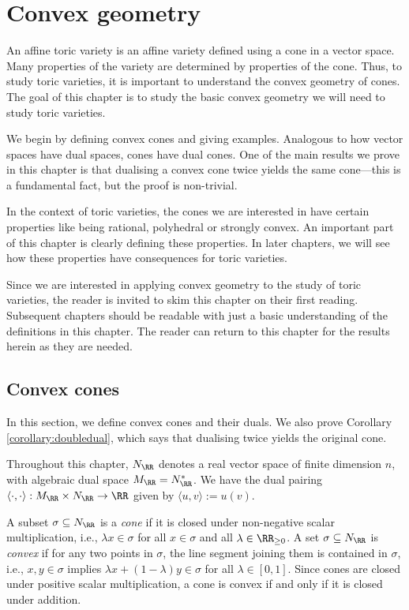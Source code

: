 \documentclass[12pt]{amsart}
\theoremstyle{plain}
\begin{document}
\newpage
{}
\section{Convex geometry}\label{sectionconvexgeometry}
An affine toric variety is an affine variety defined using a cone in a vector space.
Many properties of the variety are determined by properties of the cone.
Thus, to study toric varieties, it is important to understand the convex geometry of cones.
The goal of this chapter is to study the basic convex geometry we will need to study toric varieties.

We begin by defining convex cones and giving examples.
Analogous to how vector spaces have dual spaces, cones have dual cones.
One of the main results we prove in this chapter is that dualising a convex cone twice yields the same cone---this is a fundamental fact, but the proof is non-trivial.

In the context of toric varieties, the cones we are interested in have certain properties like being rational, polyhedral or strongly convex.
An important part of this chapter is clearly defining these properties.
In later chapters, we will see how these properties have consequences for toric varieties.

Since we are interested in applying convex geometry to the study of toric varieties, the reader is invited to skim this chapter on their first reading.
Subsequent chapters should be readable with just a basic understanding of the definitions in this chapter.
The reader can return to this chapter for the results herein as they are needed.





\subsection{Convex cones}\label{section:convexcones}
In this section, we define convex cones and their duals.
We also prove Corollary \ref{corollary:doubledual}, which says that dualising twice yields the original cone.

Throughout this chapter, $N_\RR$ denotes a real vector space of finite dimension $n$, with algebraic dual space $M_\RR = N_\RR^*$.
We have the dual pairing $\langle \cdot, \cdot \rangle : M_\RR \times N_\RR \to \RR$ given by $\langle u, v \rangle := u(v)$.

A subset $\sigma \subseteq N_\RR$ is a \emph{cone} if it is closed under non-negative scalar multiplication, i.e., $\lambda x \in \sigma$ for all $x \in \sigma$ and all $\lambda \in \RR_{\ge 0}$.
A set $\sigma \subseteq N_\RR$ is \emph{convex} if for any two points in $\sigma$, the line segment joining them is contained in $\sigma$,
i.e., $x, y \in \sigma$ implies $\lambda x + (1 - \lambda) y \in \sigma$ for all $\lambda \in [0, 1]$.
Since cones are closed under positive scalar multiplication, a cone is convex if and only if it is closed under addition.
\end{document}
